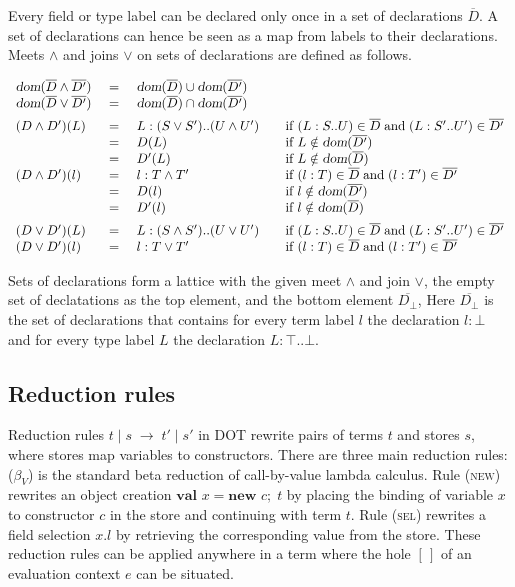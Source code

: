\documentclass{llncs}
\newcommand{\gap}{\quad\quad}
\newcommand{\ba}{\begin{array}}
\newcommand{\ea}{\end{array}}
\newcommand{\bda}{\[\ba}
\newcommand{\eda}{\ea\]}
\newcommand{\dom}{\mbox{\sl dom}}
\newcommand{\reduces}{\;\rightarrow\;}
\newcommand{\tand}{\wedge}
\newcommand{\tor}{\vee}
\newcommand{\seq}[1]{\overline{#1}}
\newcommand{\new}[3]{\textbf{val }#1 = \textbf{new }#2 ;\; #3}
\newcommand{\Ldecl}[3]{#1 : #2..#3}%
\newcommand{\ldecl}[2]{#1 : #2}
\newcommand{\Top}{\top}%
\newcommand{\Bot}{\bot}%
\newcommand{\reduction}[4]{#1 \operatorname{|} #2 \reduces #3 \operatorname{|} #4}
\begin{document}
Every field or type label can be declared only once in a set of
declarations $\seq D$. A set of declarations can hence be seen as a map from
labels to their declarations.  Meets $\wedge$ and joins $\vee$ on sets of
declarations are defined as follows.  

\bda{lcl@{\gap}l}
    
      \dom(\seq D \tand \seq {D'}) &~=~& \dom(\seq{D}) \cup \dom(\seq{D'}) \\
      \dom(\seq D \tor \seq {D'}) &=& \dom(\seq{D}) \cap \dom(\seq{D'}) \\[0.5em]
      (D \tand D')(L) &=&
        \Ldecl L {(S \tor S')} {(U \tand U')} & \mbox{if~} (\Ldecl L S U) \in \seq{D} \;\mbox{and}\; (\Ldecl L {S'} {U'}) \in \seq{D'} \\
        &=& D(L) & \mbox{if~} L \notin \dom(\seq{D'}) \\
        &=& D'(L) & \mbox{if~} L \notin \dom(\seq{D}) \\
      (D \tand D')(l) &=&
        \ldecl l {T \tand T'} & \mbox{if~} (\ldecl l T) \in \seq{D} \;\mbox{and}\; (\ldecl l {T'}) \in \seq{D'} \\
        &=& D(l) & \mbox{if~} l \notin \dom(\seq{D'}) \\
        &=& D'(l) & \mbox{if~} l \notin \dom(\seq{D}) \\[0.5em]
      (D \tor D')(L) &=&
        \Ldecl L {(S \tand S')} {(U \tor U')} & \mbox{if~} (\Ldecl L S U) \in \seq{D} \;\mbox{and}\; (\Ldecl L {S'} {U'}) \in \seq{D'} \\
      (D \tor D')(l) &=&
        \ldecl l {T \tor T'} & \mbox{if~} (\ldecl l T) \in \seq{D} \;\mbox{and}\; (\ldecl l {T'}) \in \seq{D'} 
    \eda

Sets of declarations form a lattice with the given meet $\wedge$ and
join $\vee$, the empty set of declatations as the top element, and
the bottom element $\seq{D_\Bot}$, Here $\seq{D_\Bot}$ is the set of
declarations that contains for every term label $l$ the
declaration $\ldecl l \Bot$ and for every type label $L$ the
declaration $\Ldecl L \Top \Bot$. 



\subsection*{Reduction rules}

Reduction rules $\reduction t s {t'} {s'}$ in DOT rewrite pairs of
terms $t$ and stores $s$, where stores map variables to constructors.
There are three main reduction rules: ($\beta_V$) is the standard beta
reduction of call-by-value lambda calculus. Rule (\textsc{new}) rewrites an
object creation $\new x c t$ by placing the binding of variable $x$ 
to constructor $c$ in the store and continuing with term $t$. Rule (\textsc{sel})
rewrites a field selection $x.l$ by retrieving the corresponding value from the store.
These reduction rules can be applied anywhere in a term where the hole $[\,]$ of 
an evaluation context $e$ can be situated. 
\end{document}
